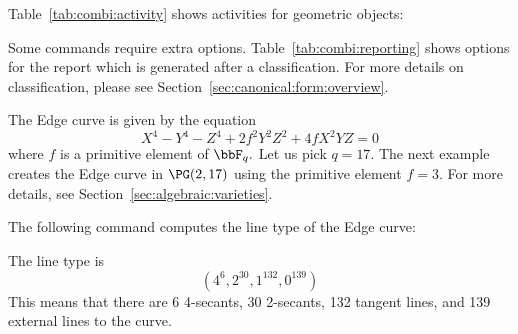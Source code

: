 Table~\ref{tab:combi:activity} shows activities for geometric objects:


Some commands require extra options. 
Table~\ref{tab:combi:reporting} shows options for the report which is generated after a classification.
For more details on classification, 
please see Section~\ref{sec:canonical:form:overview}.


\bigskip



The Edge curve is given by the equation
$$
X^4 -Y^4 -Z^4 +2f^2Y^2Z^2 +4fX^2YZ =0
$$
where $f$ is a primitive element of $\bbF_q.$
Let us pick $q=17.$
The next example creates the 
Edge curve in $\PG(2,17)$ using the primitive element $f=3$.
For more details, see Section~\ref{sec:algebraic:varieties}.









The following command computes the line type of the Edge curve:


The line type is 
$$
( 4^6, 2^{30}, 1^{132}, 0^{139} )
$$
This means that there are 6 4-secants, 
30 2-secants, 132 tangent lines, and 139 external lines to the curve.






